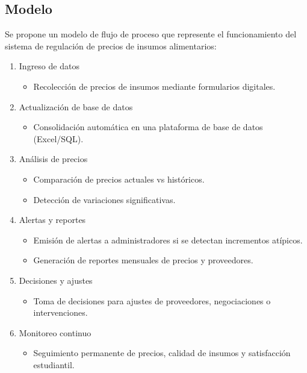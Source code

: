 \documentclass[letterpaper, 11pt]{report}
\begin{document}
\subsection{Modelo}

Se propone un modelo de flujo de proceso que represente el funcionamiento del
sistema de regulación de precios de insumos alimentarios:

\begin{enumerate}
      \item Ingreso de datos \begin{itemize}
                  \item Recolección de precios de insumos mediante formularios digitales.
            \end{itemize}

      \item Actualización de base de datos \begin{itemize}
                  \item Consolidación automática en una plataforma de base de datos (Excel/SQL).
            \end{itemize}

      \item Análisis de precios \begin{itemize}
                  \item Comparación de precios actuales vs históricos.
                  \item Detección de variaciones significativas.

            \end{itemize}

      \item Alertas y reportes \begin{itemize}
                  \item Emisión de alertas a administradores si se detectan incrementos atípicos.
                  \item Generación de reportes mensuales de precios y proveedores.

            \end{itemize}

      \item Decisiones y ajustes \begin{itemize}
                  \item Toma de decisiones para ajustes de proveedores, negociaciones o intervenciones.
            \end{itemize}

      \item Monitoreo continuo \begin{itemize}
                  \item Seguimiento permanente de precios, calidad de insumos y satisfacción
                        estudiantil.
            \end{itemize}
\end{enumerate}
\end{document}
